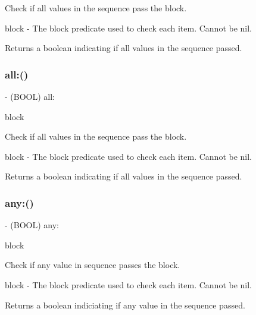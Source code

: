 Check if all values in the sequence pass the block.

block -\/ The block predicate used to check each item. Cannot be nil.

Returns a boolean indicating if all values in the sequence passed. \mbox{\label{interface_r_a_c_sequence_a1042435c369460def379265597a1cfb0}} 
\subsubsection{\texorpdfstring{all\+:()}{all:()}\hspace{0.1cm}{\footnotesize\ttfamily [3/3]}}
{\footnotesize\ttfamily -\/ (B\+O\+OL) all\+: \begin{DoxyParamCaption}\item[{(B\+O\+OL($^\wedge$)(id value))}]{block }\end{DoxyParamCaption}}

Check if all values in the sequence pass the block.

block -\/ The block predicate used to check each item. Cannot be nil.

Returns a boolean indicating if all values in the sequence passed. \mbox{\label{interface_r_a_c_sequence_abbd3bd6ea0a255fe346d8430b2cc586c}} 
\subsubsection{\texorpdfstring{any\+:()}{any:()}\hspace{0.1cm}{\footnotesize\ttfamily [1/3]}}
{\footnotesize\ttfamily -\/ (B\+O\+OL) any\+: \begin{DoxyParamCaption}\item[{(B\+O\+OL($^\wedge$)(id value))}]{block }\end{DoxyParamCaption}}

Check if any value in sequence passes the block.

block -\/ The block predicate used to check each item. Cannot be nil.

Returns a boolean indiciating if any value in the sequence passed. \mbox{\label{interface_r_a_c_sequence_abbd3bd6ea0a255fe346d8430b2cc586c}} 
